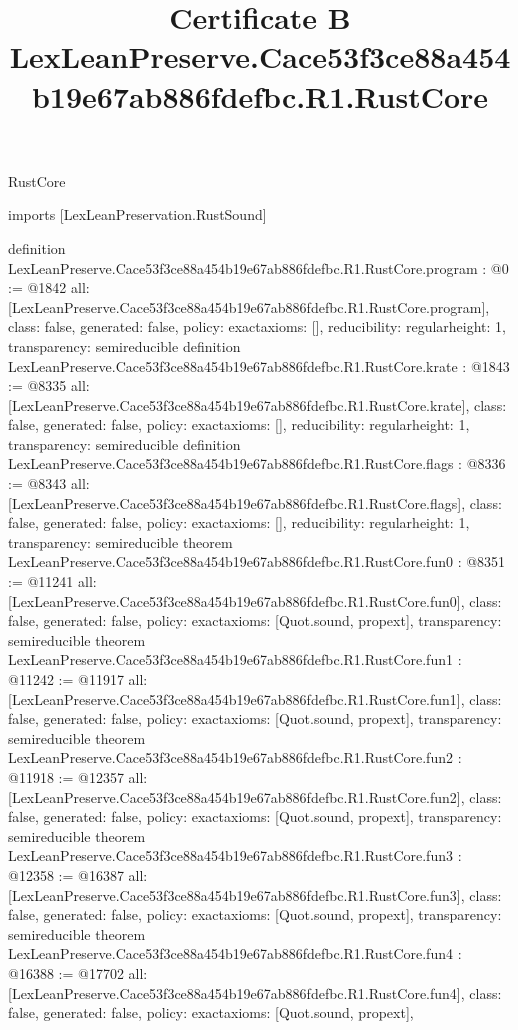 \begin{lexlean}{RustCore}
\title{Certificate B LexLeanPreserve.Cace53f3ce88a454b19e67ab886fdefbc.R1.RustCore}
\begin{coremodule}
imports [LexLeanPreservation.RustSound]

definition LexLeanPreserve.Cace53f3ce88a454b19e67ab886fdefbc.R1.RustCore.program : @0 := @1842 {
  all: [LexLeanPreserve.Cace53f3ce88a454b19e67ab886fdefbc.R1.RustCore.program],
  class: false,
  generated: false,
  policy: exact{axioms: []},
  reducibility: regular{height: 1},
  transparency: semireducible
}
definition LexLeanPreserve.Cace53f3ce88a454b19e67ab886fdefbc.R1.RustCore.krate : @1843 := @8335 {
  all: [LexLeanPreserve.Cace53f3ce88a454b19e67ab886fdefbc.R1.RustCore.krate],
  class: false,
  generated: false,
  policy: exact{axioms: []},
  reducibility: regular{height: 1},
  transparency: semireducible
}
definition LexLeanPreserve.Cace53f3ce88a454b19e67ab886fdefbc.R1.RustCore.flags : @8336 := @8343 {
  all: [LexLeanPreserve.Cace53f3ce88a454b19e67ab886fdefbc.R1.RustCore.flags],
  class: false,
  generated: false,
  policy: exact{axioms: []},
  reducibility: regular{height: 1},
  transparency: semireducible
}
theorem LexLeanPreserve.Cace53f3ce88a454b19e67ab886fdefbc.R1.RustCore.fun0 : @8351 := @11241 {
  all: [LexLeanPreserve.Cace53f3ce88a454b19e67ab886fdefbc.R1.RustCore.fun0],
  class: false,
  generated: false,
  policy: exact{axioms: [Quot.sound, propext]},
  transparency: semireducible
}
theorem LexLeanPreserve.Cace53f3ce88a454b19e67ab886fdefbc.R1.RustCore.fun1 : @11242 := @11917 {
  all: [LexLeanPreserve.Cace53f3ce88a454b19e67ab886fdefbc.R1.RustCore.fun1],
  class: false,
  generated: false,
  policy: exact{axioms: [Quot.sound, propext]},
  transparency: semireducible
}
theorem LexLeanPreserve.Cace53f3ce88a454b19e67ab886fdefbc.R1.RustCore.fun2 : @11918 := @12357 {
  all: [LexLeanPreserve.Cace53f3ce88a454b19e67ab886fdefbc.R1.RustCore.fun2],
  class: false,
  generated: false,
  policy: exact{axioms: [Quot.sound, propext]},
  transparency: semireducible
}
theorem LexLeanPreserve.Cace53f3ce88a454b19e67ab886fdefbc.R1.RustCore.fun3 : @12358 := @16387 {
  all: [LexLeanPreserve.Cace53f3ce88a454b19e67ab886fdefbc.R1.RustCore.fun3],
  class: false,
  generated: false,
  policy: exact{axioms: [Quot.sound, propext]},
  transparency: semireducible
}
theorem LexLeanPreserve.Cace53f3ce88a454b19e67ab886fdefbc.R1.RustCore.fun4 : @16388 := @17702 {
  all: [LexLeanPreserve.Cace53f3ce88a454b19e67ab886fdefbc.R1.RustCore.fun4],
  class: false,
  generated: false,
  policy: exact{axioms: [Quot.sound, propext]},
}
\end{coremodule}
\end{lexlean}
